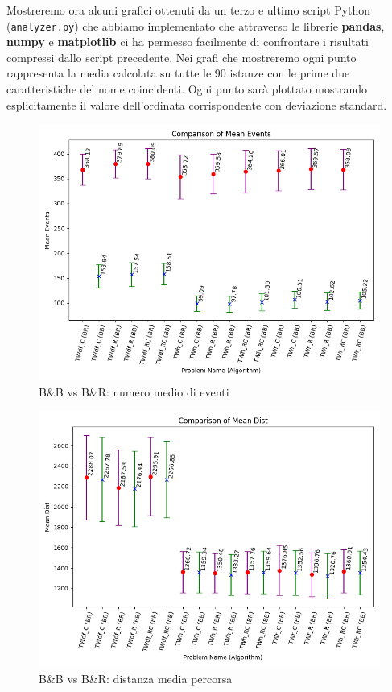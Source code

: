 \documentclass[
    article,            %
    12pt,                %
    oneside,            %
    a4paper,            %
    english,            %
    italian,                %
    sumario=tradicional,
]{abntex2}
\begin{document}
Mostreremo ora alcuni grafici ottenuti da un terzo e ultimo script Python (\texttt{analyzer.py}) che abbiamo implementato che attraverso le librerie \textbf{pandas}, \textbf{numpy} e \textbf{matplotlib} ci ha permesso facilmente di confrontare i risultati compressi dallo script precedente.
\newline Nei grafi che mostreremo ogni punto rappresenta la media calcolata su tutte le 90 istanze con le prime due caratteristiche del nome coincidenti. Ogni punto sarà plottato mostrando esplicitamente il valore dell'ordinata corrispondente con deviazione standard.
\vspace{2.5cm}
\begin{figure}[!h]
    \centering
    \includegraphics[width=1.0\textwidth]{Images/mean_events}
    \par
    \caption{B\&B vs B\&R: numero medio di eventi}
    \label{fig:mean_events}
\end{figure}
\newpage{}
\vspace*{\fill}
\begin{figure}[h!]
    \centering
    \includegraphics[width=1.0\textwidth]{Images/Mean_dist.png}
    \caption{B\&B vs B\&R: distanza media percorsa}
    \label{fig:Mean_dist}
\end{figure}
\end{document}
